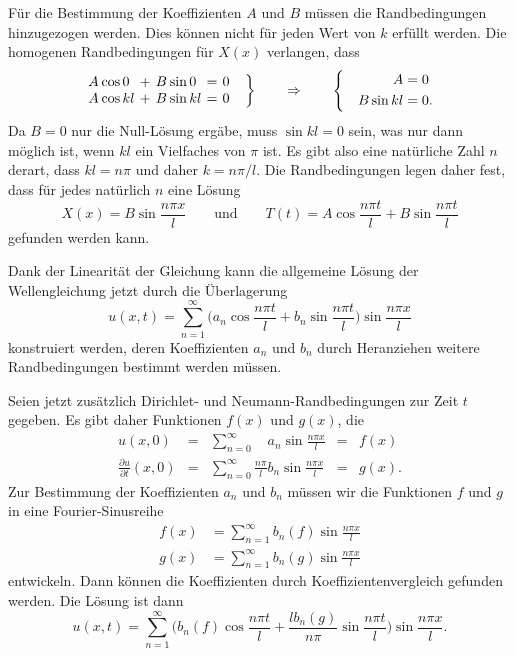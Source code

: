 Für die Bestimmung der Koeffizienten $A$ und $B$ müssen die 
Randbedingungen hinzugezogen werden.
Dies können nicht für jeden Wert von $k$ erfüllt werden.
Die homogenen Randbedingungen für $X(x)$ verlangen, dass
\begin{equation*}
\left.
\bgroup
\renewcommand{\arraycolsep}{1pt}
\begin{array}{rlcrlcl}
A&\cos 0 &\,+\,&B&\sin 0  &\,=\,& 0\\
A&\cos kl&\,+\,&B&\sin kl &\,=\,& 0
\end{array}
\egroup
\quad
\right\}
\qquad\Rightarrow\qquad
\left\{
\quad
\begin{aligned}
        A&= 0 \\
B\sin kl &= 0.
\end{aligned}
\right.
\end{equation*}
Da $B=0$ nur die Null-Lösung ergäbe, muss $\sin kl=0$ sein, was nur
dann möglich ist, wenn $kl$ ein Vielfaches von $\pi$ ist.
Es gibt also eine natürliche Zahl $n$ derart, dass
$kl=n\pi$ und daher $k=n\pi/l$.
Die Randbedingungen legen daher fest, dass für jedes natürlich $n$ eine
Lösung
\[
X(x) = B \sin \frac{n\pi x}{l}
\qquad\text{und}\qquad
T(t) = A \cos \frac{n\pi t}{l} + B \sin\frac{n\pi t}{l}
\]
gefunden werden kann.

Dank der Linearität der Gleichung kann die allgemeine Lösung der
Wellengleichung jetzt durch die Überlagerung
\[
u(x,t)
=
\sum_{n=1}^\infty
\biggl(
a_n\cos\frac{n\pi t}{l}
+
b_n\sin\frac{n\pi t}{l}
\biggr)
\sin\frac{n\pi x}{l}
\]
konstruiert werden, deren Koeffizienten $a_n$ und $b_n$ durch
Heranziehen weitere Randbedingungen bestimmt werden müssen.

Seien jetzt zusätzlich Dirichlet- und Neumann-Randbedingungen zur Zeit
$t$ gegeben.
Es gibt daher Funktionen $f(x)$ und $g(x)$, die
\[
\renewcommand{\arraycolsep}{2pt}
\begin{array}{rclcl}
u(x,0)
&=&
\displaystyle
\sum_{n=0}^\infty \phantom{\frac{n\pi}{l}}a_n \sin\frac{n\pi x}{l}
&=&
f(x) \\
\displaystyle
\frac{\partial u}{\partial t}(x,0)
&=&
\displaystyle
\sum_{n=0}^\infty \frac{n\pi}{l}b_n \sin\frac{n\pi x}{l}
&=&
g(x).
\end{array}
\]
Zur Bestimmung der Koeffizienten $a_n$ und $b_n$ müssen wir die
Funktionen $f$ und $g$ in eine Fourier-Sinusreihe
\begin{align*}
f(x) & = \sum_{n=1}^\infty b_n(f)\sin \frac{n\pi x}{l} \\
g(x) & = \sum_{n=1}^\infty b_n(g)\sin \frac{n\pi x}{l}
\end{align*}
entwickeln.
Dann können die Koeffizienten durch Koeffizientenvergleich gefunden
werden.
Die Lösung ist dann
\[
u(x,t)
=
\sum_{n=1}^\infty
\biggl(
b_n(f)
\cos\frac{n\pi t}{l}
+
\frac{lb_n(g)}{n\pi}
\sin\frac{n\pi t}{l}
\biggr)
\sin\frac{n\pi x}{l}.
\]

